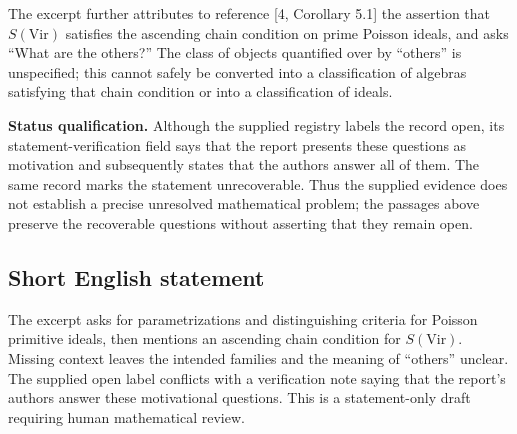 \documentclass[11pt]{article}
\begin{document}
The excerpt further attributes to reference [4, Corollary 5.1] the assertion that \(S(\mathrm{Vir})\) satisfies the ascending chain condition on prime Poisson ideals, and asks ``What are the others?'' The class of objects quantified over by ``others'' is unspecified; this cannot safely be converted into a classification of algebras satisfying that chain condition or into a classification of ideals.

\textbf{Status qualification.} Although the supplied registry labels the record open, its statement-verification field says that the report presents these questions as motivation and subsequently states that the authors answer all of them. The same record marks the statement unrecoverable. Thus the supplied evidence does not establish a precise unresolved mathematical problem; the passages above preserve the recoverable questions without asserting that they remain open.
\subsection{Short English statement}
The excerpt asks for parametrizations and distinguishing criteria for Poisson primitive ideals, then mentions an ascending chain condition for \(S(\mathrm{Vir})\). Missing context leaves the intended families and the meaning of ``others'' unclear. The supplied open label conflicts with a verification note saying that the report's authors answer these motivational questions. This is a statement-only draft requiring human mathematical review.
\end{document}
